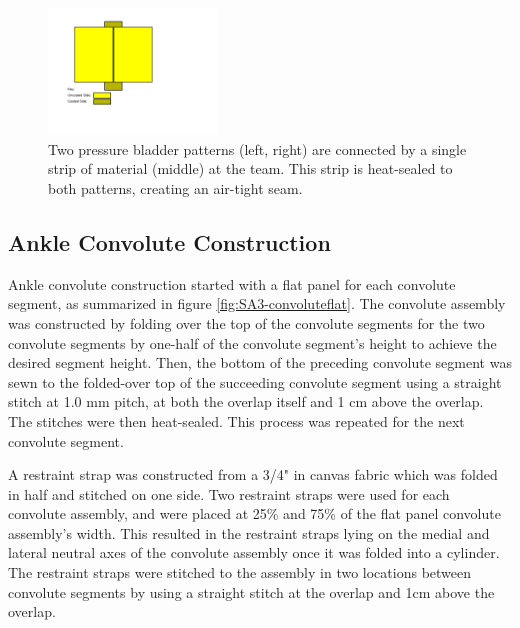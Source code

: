 \documentclass[defaultstyle,11pt]{thesis}
\begin{document}
\hypertarget{fig:SA3-seam}{%
\begin{figure}
\centering
\includegraphics[width=0.4\textwidth,height=\textheight]{../fig/SA3/BladderSeam.png}
\caption[{Pressure bladder construction technique}]{Two pressure bladder patterns (left, right) are connected by a single strip of material (middle) at the team. This strip is heat-sealed to both patterns, creating an air-tight seam.}
\label{fig:SA3-seam}
\end{figure}
}

\hypertarget{ankle-convolute-construction}{%
\subsection{Ankle Convolute Construction}\label{ankle-convolute-construction}}

Ankle convolute construction started with a flat panel for each convolute segment, as summarized in figure \ref{fig:SA3-convoluteflat}.
The convolute assembly was constructed by folding over the top of the convolute segments for the two convolute segments by one-half of the convolute segment's height to achieve the desired segment height.
Then, the bottom of the preceding convolute segment was sewn to the folded-over top of the succeeding convolute segment using a straight stitch at 1.0 mm pitch, at both the overlap itself and 1 cm above the overlap.
The stitches were then heat-sealed.
This process was repeated for the next convolute segment.

A restraint strap was constructed from a 3/4" in canvas fabric which was folded in half and stitched on one side.
Two restraint straps were used for each convolute assembly, and were placed at 25\% and 75\% of the flat panel convolute assembly's width.
This resulted in the restraint straps lying on the medial and lateral neutral axes of the convolute assembly once it was folded into a cylinder.
The restraint straps were stitched to the assembly in two locations between convolute segments by using a straight stitch at the overlap and 1cm above the overlap.
\end{document}
